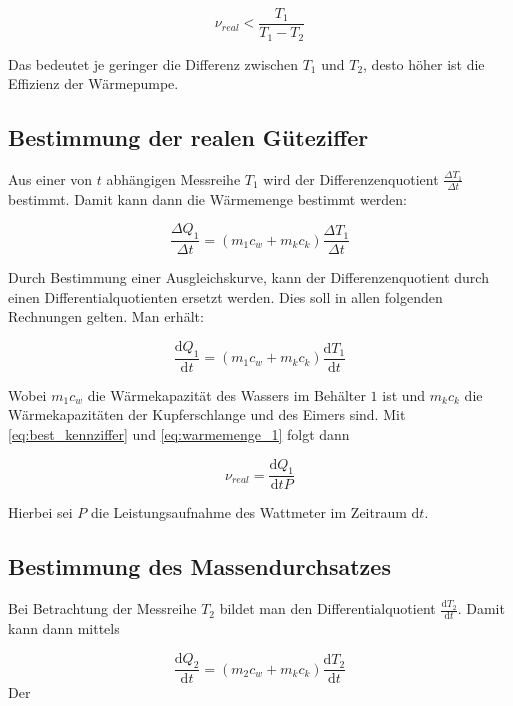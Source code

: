 \begin{equation*}
\nu_{real}<\frac{T_1}{T_1-T_2}
\end{equation*}

Das bedeutet je geringer die Differenz zwischen $T_1$ und $T_2$,
desto höher ist die Effizienz der Wärmepumpe.

\subsection{Bestimmung der realen Güteziffer}
Aus einer von $t$ abhängigen Messreihe $T_1$ wird der Differenzenquotient $\frac{\Delta T_1}{\Delta t}$ bestimmt.
Damit kann dann die Wärmemenge bestimmt werden:

\begin{equation*}
\frac{\Delta Q_1}{\Delta t}=\left(m_1c_w+m_kc_k\right)\frac{\Delta T_1}{\Delta t}
\end{equation*}

Durch Bestimmung einer Ausgleichskurve, kann der
Differenzenquotient durch einen Differentialquotienten
ersetzt werden.
Dies soll in allen folgenden Rechnungen gelten.
Man erhält:

\begin{equation}
\label{eq:warmemenge_1}
\frac{\mathup{d} Q_1}{\mathup{d} t}=\left(m_1c_w+m_kc_k\right)\frac{\mathup{d} T_1}{\mathup{d} t}
\end{equation}

Wobei $m_1c_w$ die Wärmekapazität des Wassers im Behälter $1$ ist und
$m_kc_k$ die Wärmekapazitäten der Kupferschlange und des Eimers sind.
Mit \eqref{eq:best_kennziffer} und \eqref{eq:warmemenge_1} folgt dann

\begin{equation}
\label{eq:bestimmung_ziffer}
\nu_{real}=\frac{\mathup{d}Q_1}{\mathup{d}tP}
\end{equation}

Hierbei sei $P$ die Leistungsaufnahme des Wattmeter im Zeitraum $\mathup{d}t$.

\subsection{Bestimmung des Massendurchsatzes}

Bei Betrachtung der Messreihe $T_2$ bildet man den Differentialquotient $\frac{\mathup{d}T_2}{\mathup{d}t}$.
Damit kann dann mittels

\begin{equation*}
\frac{\mathup{d} Q_2}{\mathup{d} t}=\left(m_2c_w+m_kc_k\right)\frac{\mathup{d} T_2}{\mathup{d} t}
\end{equation*}Der


